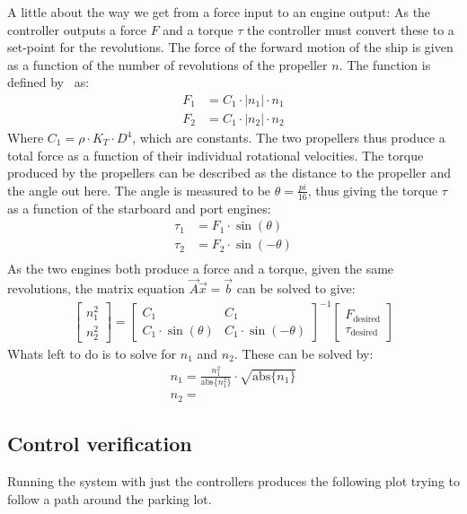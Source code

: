 \documentclass{ifacconf}
\begin{document}
A little about the way we get from a force input to an engine output:
As the controller outputs a force $F$ and a torque $\tau$ the controller must convert these to a set-point for the revolutions. The force of the forward motion of the ship is given as a function of the number of revolutions of the propeller $n$. The function is defined by \cite{cyber} as:
\begin{align}
F_1 &= C_1 \cdot |n_1| \cdot n_1\\
F_2 &= C_1 \cdot |n_2| \cdot n_2
\end{align}
Where $C_1 = \rho \cdot K_T \cdot D^4$, which are constants. The two propellers thus produce a total force as a function of their individual rotational velocities. The torque produced by the propellers can be described as the distance to the propeller and the angle out here. The angle is measured to be $\theta = \frac{pi}{16}$, thus giving the torque $\tau$ as a function of the starboard and port engines:
\begin{align}
\tau_1 &= F_1 \cdot \sin(\theta)\\
\tau_2 &= F_2 \cdot \sin(-\theta)\\
\end{align}
As the two engines both produce a force and a torque, given the same revolutions, the matrix equation $\vec{A}\vec{x} = \vec{b}$ can be solved to give:
\begin{align}
\begin{bmatrix}
n_1^2\\
n_2^2
\end{bmatrix} = \begin{bmatrix}
C_1 & C_1\\
C_1 \cdot \sin(\theta) & C_1 \cdot \sin(-\theta)
\end{bmatrix}^{-1}\begin{bmatrix}
F_\text{desired}\\
\tau_\text{desired}
\end{bmatrix}
\end{align}
Whats left to do is to solve for $n_1$ and $n_2$. These can be solved by:
\begin{align}
n_1 = \frac{n_1^2}{\text{abs}\{n_1^2\}} \cdot \sqrt{\text{abs}\{n_1\}}\\
n_2 = 
\end{align}


\subsection{Control verification}
Running the system with just the controllers produces the following plot trying to follow a path around the parking lot. 
\end{document}

